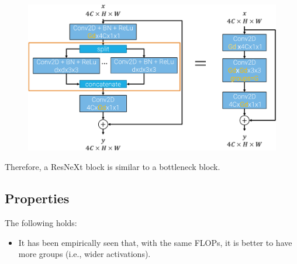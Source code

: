 \begin{description}
\begin{description}
\begin{descriptionlist}
                        \begin{figure}[H]
                            \centering
                            \includegraphics[width=0.6\linewidth]{./img/_resnext_to_resnet_l2.pdf}
                        \end{figure}
                \end{descriptionlist}

            \begin{remark}
                Therefore, a ResNeXt block is similar to a bottleneck block.
            \end{remark}
        \end{description}
\end{description}


\subsection{Properties}

The following holds:
\begin{itemize}
    \item It has been empirically seen that, with the same FLOPs, it is better to have more groups (i.e., wider activations).
\end{itemize}